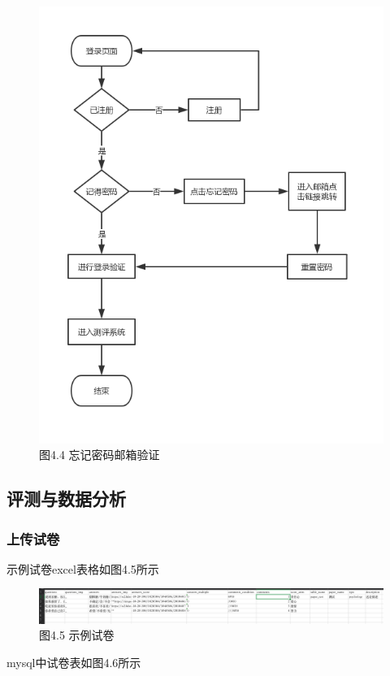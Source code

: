 \begin{figure}[thbp!]
	\centering
	\includegraphics[width=0.8\linewidth]{figure/password_mail}
	\label{fig:password_email} \\
		图4.4 忘记密码邮箱验证
\end{figure}

\subsection{评测与数据分析}

\subsubsection{上传试卷}

示例试卷excel表格如图4.5所示

\begin{figure}[thbp!]
	\centering
	\includegraphics[width=1.0\linewidth]{figure/paper}
	\label{fig:paper} \\
		图4.5 示例试卷
\end{figure}

mysql中试卷表如图4.6所示


